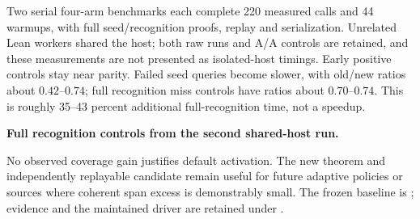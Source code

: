 Two serial four-arm benchmarks each complete 220 measured calls and 44
warmups, with full seed/recognition proofs, replay and serialization.
Unrelated Lean workers shared the host; both raw runs and A/A controls
are retained, and these measurements are not presented as isolated-host
timings. Early positive controls stay near parity. Failed seed queries
become slower, with old/new ratios about $0.42$--$0.74$; full recognition
miss controls have ratios about $0.70$--$0.74$. This is roughly
35--43 percent additional full-recognition time, not a speedup.

\begin{samepage}
\noindent\textbf{Full recognition controls from the second shared-host run.}

\end{samepage}

No observed coverage gain justifies default activation. The new theorem
and independently replayable candidate remain useful for future adaptive
policies or sources where coherent span excess is demonstrably small.
The frozen baseline is ; evidence and the maintained
 driver are retained under .

